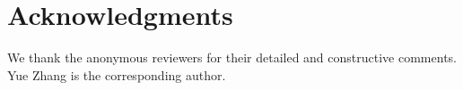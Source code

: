\documentclass[11pt,letterpaper]{article}
\begin{document}
\begin{comment}
\begin{table}[!tp]
\begin{center}
\renewcommand{\arraystretch}{0.8}
\begin{tabular}{>{\small}l|>{\small}c<{\hspace{-6pt}}>{\small}c<{\hspace{-6pt}}>{\small}c}
\hline
& \multicolumn{3}{>{\small}c}{exponentiation  } \\
\hline
\# & 0.6 & 0.8 & 1.0 \\
\hline
100 & 93.4/94.1/97.6 & 93.6/94.2/97.3 & 93.5/94.1/96.9 \\
200 & 93.6/94.3/97.9 & 93.5/94.4/97.8 & 93.7/94.3/97.3 \\
400 & //98.3 & //98.1 & //97.7 \\
800 & // & // & // \\
1000 & // & // & // \\
1600 & // & // & // \\
\hline
\end{tabular}
\end{center}
\caption{\label{rerank} Reranking results of the in-order parser on section 22 of WSJ. (supervised reranking / semi-supervised reranking / oracle).}
\end{table}
\end{comment}

\section*{Acknowledgments}
We thank the anonymous reviewers for their detailed and constructive comments.
Yue Zhang is the corresponding author.



\end{document}
